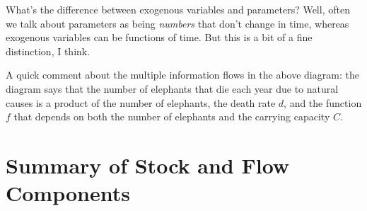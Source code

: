 What's the difference between exogenous variables and parameters?  Well, often we talk about parameters as being {\it numbers} that don't change in time, whereas exogenous variables can be functions of time.  But this is a bit of a fine distinction, I think.

A quick comment about the multiple information flows in the above diagram:  the diagram says that the number of elephants that die each year due to natural causes is a product of the number of elephants, the death rate $d$, and the function $f$ that depends on both the number of elephants and the carrying capacity $C$.

\vfill

\pagebreak

\section{Summary of Stock and Flow Components}

